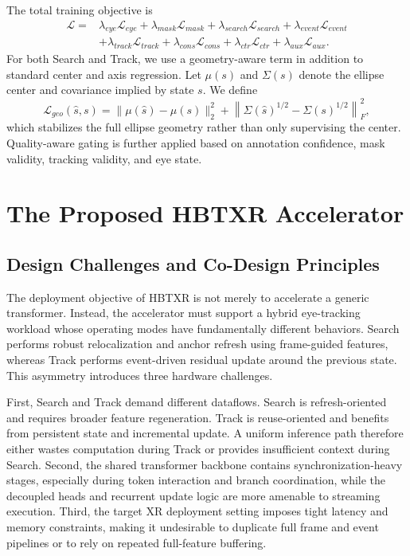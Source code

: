 \documentclass[journal]{IEEEtran}
\begin{document}
The total training objective is
\begin{equation}
\begin{aligned}
\mathcal{L}={}&\lambda_{eye}\mathcal{L}_{eye}+\lambda_{mask}\mathcal{L}_{mask}+\lambda_{search}\mathcal{L}_{search}+\lambda_{event}\mathcal{L}_{event}\\
&+\lambda_{track}\mathcal{L}_{track}+\lambda_{cons}\mathcal{L}_{cons}+\lambda_{ctr}\mathcal{L}_{ctr}+\lambda_{aux}\mathcal{L}_{aux}.
\end{aligned}
\end{equation}
For both Search and Track, we use a geometry-aware term in addition to standard center and axis regression. Let $\mu(s)$ and $\Sigma(s)$ denote the ellipse center and covariance implied by state $s$. We define
\begin{equation}
\mathcal{L}_{geo}(\hat s,s)=\|\mu(\hat s)-\mu(s)\|_2^2 + \left\|\Sigma(\hat s)^{1/2}-\Sigma(s)^{1/2}\right\|_F^2,
\end{equation}
which stabilizes the full ellipse geometry rather than only supervising the center. Quality-aware gating is further applied based on annotation confidence, mask validity, tracking validity, and eye state.

\section{The Proposed HBTXR Accelerator}
\subsection{Design Challenges and Co-Design Principles}
The deployment objective of HBTXR is not merely to accelerate a generic transformer. Instead, the accelerator must support a hybrid eye-tracking workload whose operating modes have fundamentally different behaviors. Search performs robust relocalization and anchor refresh using frame-guided features, whereas Track performs event-driven residual update around the previous state. This asymmetry introduces three hardware challenges.

First, Search and Track demand different dataflows. Search is refresh-oriented and requires broader feature regeneration. Track is reuse-oriented and benefits from persistent state and incremental update. A uniform inference path therefore either wastes computation during Track or provides insufficient context during Search. Second, the shared transformer backbone contains synchronization-heavy stages, especially during token interaction and branch coordination, while the decoupled heads and recurrent update logic are more amenable to streaming execution. Third, the target XR deployment setting imposes tight latency and memory constraints, making it undesirable to duplicate full frame and event pipelines or to rely on repeated full-feature buffering.
\end{document}
